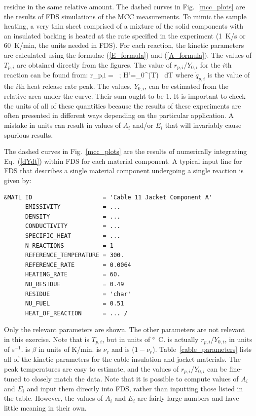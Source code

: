 \documentclass[11pt]{book}
\begin{document}
residue in the same relative amount.
The dashed curves in Fig.~\ref{mcc_plots} are the results of FDS simulations of the MCC measurements. To mimic the
sample heating, a very thin sheet comprised of a mixture of the solid components with an insulated backing is heated at the
rate specified in the experiment (1~K/s or 60~K/min, the units needed in FDS).
For each reaction,
the kinetic parameters are calculated using the formulae (\ref{E_formula}) and (\ref{A_formula}). The values of
$T_{p,i}$ are obtained directly from the figures. The value of $r_{p,i}/Y_{0,i}$ for the $i$th reaction can be found from:
\be
   r_{p,i} = \beta \,    \quad ; \quad
   \Delta H'=\int_0^\infty {}(T) \, dT   \label{r_formula}
\ee
where $\dot{q}_{p,i}$ is the value of the $i$th heat release rate peak. The values, $Y_{0,i}$, can be estimated from the
relative area under the curve. Their sum ought to be 1.
It is important to check the units of all of these quantities because the
results of these experiments are often presented in different ways depending on the particular application. A mistake
in units can result in values of $A_i$ and/or $E_i$ that will invariably cause spurious results.

The dashed curves in Fig.~\ref{mcc_plots} are the results of numerically integrating Eq.~(\ref{dYdt}) within FDS for each
material component. A typical input line for FDS that describes a single material component undergoing a single
reaction is given by:

\begin{lstlisting}
&MATL ID                    = 'Cable 11 Jacket Component A'
      EMISSIVITY            = ...
      DENSITY               = ...
      CONDUCTIVITY          = ...
      SPECIFIC_HEAT         = ...
      N_REACTIONS           = 1
      REFERENCE_TEMPERATURE = 300.
      REFERENCE_RATE        = 0.0064
      HEATING_RATE          = 60.
      NU_RESIDUE            = 0.49
      RESIDUE               = 'char'
      NU_FUEL               = 0.51
      HEAT_OF_REACTION      = ... /
\end{lstlisting}

\noindent Only the relevant parameters are shown. The other parameters are not relevant in this
exercise. Note that  is $T_{p,i}$, but in units of \si{\degree C}.  is actually
$r_{p,i}/Y_{0,i}$, in units of s$^{-1}$.  is $\beta$ in units of K/min.
 is $\nu_r$ and  is ($1-\nu_r$).
Table~\ref{cable_parameters} lists all of the kinetic parameters for the cable insulation and jacket
materials. The peak temperatures are easy to estimate, and the values of $r_{p,i}/Y_{0,i}$ can be fine-tuned to closely match
the data. Note that it is possible to compute values of $A_i$ and $E_i$ and input them directly into FDS, rather
than inputting those listed in the table. However, the values of $A_i$ and $E_i$ are fairly large numbers and have little
meaning in their own.
\end{document}
